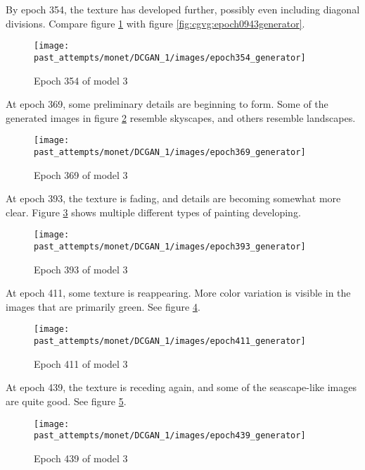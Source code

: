 \documentclass[11pt,letterpaper]{article}
\begin{document}
				By epoch 354, the texture has developed further, possibly even including diagonal divisions.
				Compare figure \ref{fig:cgm:epoch354generator} with figure \ref{fig:cgvg:epoch0943generator}.
				\begin{figure}
					\centering
					\texttt{[image: past\_attempts/monet/DCGAN\_1/images/epoch354\_generator]}
					\caption[]{Epoch 354 of model 3}
					\label{fig:cgm:epoch354generator}
				\end{figure}

				At epoch 369, some preliminary details are beginning to form.
				Some of the generated images in figure \ref{fig:cgm:epoch369generator} resemble skyscapes, and others resemble landscapes.
				\begin{figure}
					\centering
					\texttt{[image: past\_attempts/monet/DCGAN\_1/images/epoch369\_generator]}
					\caption[]{Epoch 369 of model 3}
					\label{fig:cgm:epoch369generator}
				\end{figure}

				At epoch 393, the texture is fading, and details are becoming somewhat more clear.
				Figure \ref{fig:cgm:epoch393generator} shows multiple different types of painting developing.
				\begin{figure}
					\centering
					\texttt{[image: past\_attempts/monet/DCGAN\_1/images/epoch393\_generator]}
					\caption[]{Epoch 393 of model 3}
					\label{fig:cgm:epoch393generator}
				\end{figure}

				At epoch 411, some texture is reappearing.
				More color variation is visible in the images that are primarily green.
				See figure \ref{fig:cgm:epoch411generator}.
				\begin{figure}
					\centering
					\texttt{[image: past\_attempts/monet/DCGAN\_1/images/epoch411\_generator]}
					\caption[]{Epoch 411 of model 3}
					\label{fig:cgm:epoch411generator}
				\end{figure}

				At epoch 439, the texture is receding again, and some of the seascape-like images are quite good.
				See figure \ref{fig:cgm:epoch439generator}.
				\begin{figure}
					\centering
					\texttt{[image: past\_attempts/monet/DCGAN\_1/images/epoch439\_generator]}
					\caption[]{Epoch 439 of model 3}
					\label{fig:cgm:epoch439generator}
				\end{figure}
\end{document}
